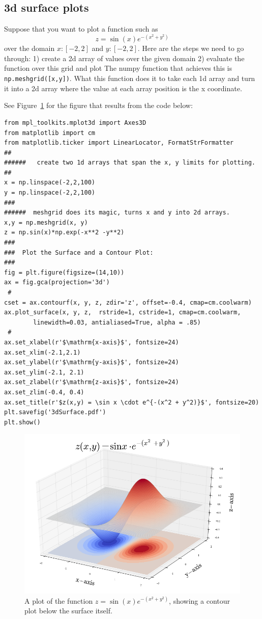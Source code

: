 \subsection{3d surface plots}\label{subsec:3dsurfaceplot}
Suppose that you want to plot a function such as
$$ z = \sin(x) e^{-(x^2+y^2)} $$
over the domain $x: [-2,2]$ and $y:[-2,2]$. Here are the steps we need to go through:
1) create a 2d array of values over the given domain
2) evaluate the function over this grid and plot
The numpy function that achieves this is \lstinline{np.meshgrid([x,y])}. What this function does it to take each 1d array and turn it into a 2d array where the value at each array position is the x coordinate. 

See Figure~\ref{fig:3dSurfacePlot}  for the figure that results from the code below:
\begin{lstlisting}
from mpl_toolkits.mplot3d import Axes3D
from matplotlib import cm
from matplotlib.ticker import LinearLocator, FormatStrFormatter
##
######   create two 1d arrays that span the x, y limits for plotting.
##
x = np.linspace(-2,2,100)
y = np.linspace(-2,2,100)
###
######  meshgrid does its magic, turns x and y into 2d arrays.
x,y = np.meshgrid(x, y)
z = np.sin(x)*np.exp(-x**2 -y**2)
###
###  Plot the Surface and a Contour Plot:
###
fig = plt.figure(figsize=(14,10))
ax = fig.gca(projection='3d')
 #
cset = ax.contourf(x, y, z, zdir='z', offset=-0.4, cmap=cm.coolwarm)
ax.plot_surface(x, y, z,  rstride=1, cstride=1, cmap=cm.coolwarm,
        linewidth=0.03, antialiased=True, alpha = .85)
 #
ax.set_xlabel(r'$\mathrm{x-axis}$', fontsize=24)
ax.set_xlim(-2.1,2.1)
ax.set_ylabel(r'$\mathrm{y-axis}$', fontsize=24)
ax.set_ylim(-2.1, 2.1)
ax.set_zlabel(r'$\mathrm{z-axis}$', fontsize=24)
ax.set_zlim(-0.4, 0.4)
ax.set_title(r'$z(x,y) = \sin x \cdot e^{-(x^2 + y^2)}$', fontsize=20)
plt.savefig('3dSurface.pdf')
plt.show()
\end{lstlisting}
%
\begin{figure}[h]
	\centering
	\includegraphics[width=12cm]{Figures/BasicPython/3dSurfacePlot.png}
	\caption{A plot of the function $ z = \sin(x) e^{-(x^2+y^2)} $, showing a contour plot below the surface itself.  }
	\label{fig:3dSurfacePlot}       %
\end{figure}

